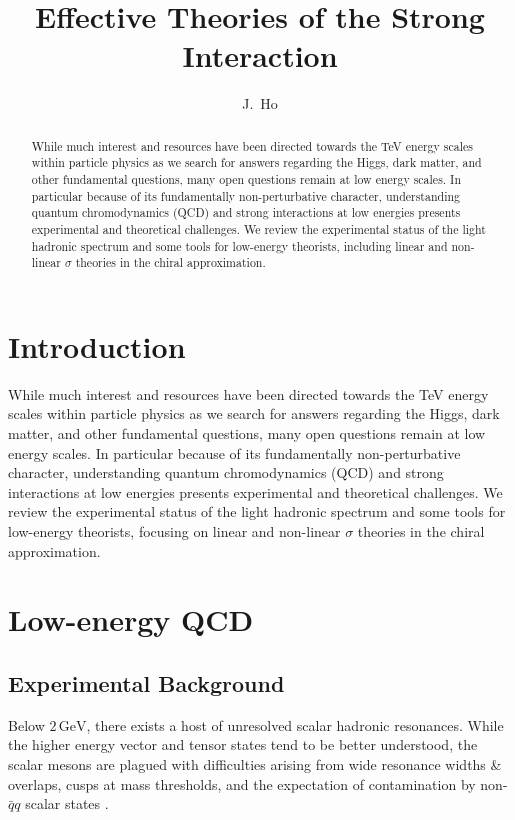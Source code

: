 \documentclass[aps,prd,onecolumn,showpacs,amsmath,amssymb,nofootinbib]{revtex4} \pdfoutput=1
\begin{document}
\title{Effective Theories of the Strong Interaction}

\author{J.~Ho}

\begin{abstract}
While much interest and resources have been directed towards the TeV energy scales within particle physics as we search for answers regarding the Higgs, dark matter, and other fundamental questions, many open questions remain at low energy scales. In particular because of its fundamentally non-perturbative character, understanding quantum chromodynamics (QCD) and strong interactions at low energies presents experimental and theoretical challenges. We review the experimental status of the light hadronic spectrum and some tools for low-energy theorists, including linear and non-linear $\sigma$ theories in the chiral approximation.
\end{abstract}
\maketitle
\section{Introduction}\label{I}
While much interest and resources have been directed towards the TeV energy scales within particle physics as we search for answers regarding the Higgs, dark matter, and other fundamental questions, many open questions remain at low energy scales. In particular because of its fundamentally non-perturbative character, understanding quantum chromodynamics (QCD) and strong interactions at low energies presents experimental and theoretical challenges. We review the experimental status of the light hadronic spectrum and some tools for low-energy theorists, focusing on linear and non-linear $\sigma$ theories in the chiral approximation.


\section{Low-energy QCD}\label{II}
\subsection{Experimental Background}
Below $2\,\mathrm{GeV}$, there exists a host of unresolved scalar hadronic resonances. While the higher energy vector and tensor states tend to be better understood, the scalar mesons are plagued with difficulties arising from wide resonance widths \& overlaps, cusps at mass thresholds, and the expectation of contamination by non-$\bar{q}q$ scalar states \cite{PDG2014}.
\end{document}
